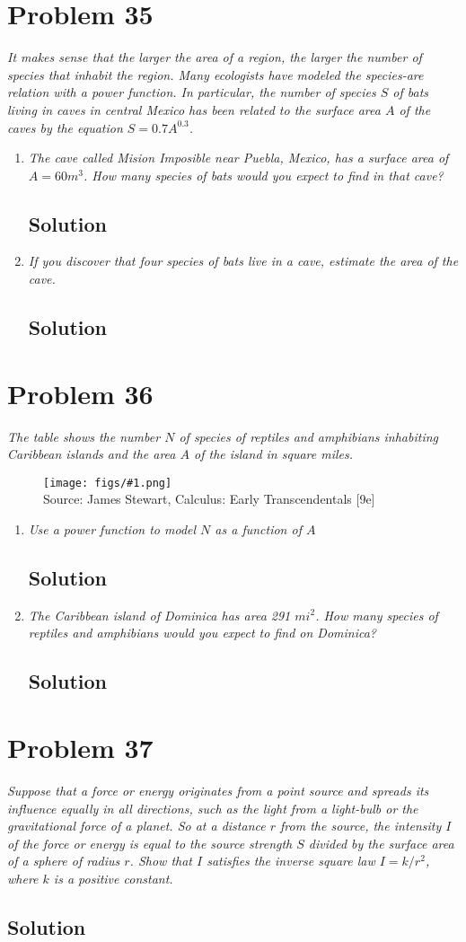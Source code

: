 \documentclass[11pt]{article}
\newcommand{\soln}{\subsection*}
\newcommand{\qn}{\textit}
\newcommand{\imagesource}[1]{{\footnotesize Source: #1}}
\newcommand{\imgqn}[1]{
	\begin{figure}[H]
		\centering
		\texttt{[image: figs/\#1.png]}\\
		\imagesource{James Stewart, Calculus: Early Transcendentals [9e]}
	\end{figure}
}
\begin{document}
\section*{Problem 35}

\qn{It makes sense that the larger the area of a region, the larger the number of species that inhabit the region. Many ecologists have modeled the species-are relation with a power function. In particular, the number of species $S$ of bats living in caves in central Mexico has been related to the surface area $A$ of the caves by the equation $S=0.7A^{0.3}$.}

\begin{enumerate}
	\item \qn{The cave called Mision Imposible near Puebla, Mexico, has a surface area of $A=60m^3$. How many species of bats would you expect to find in that cave?}
	\soln{Solution}
	
	\item \qn{If you discover that four species of bats live in a cave, estimate the area of the cave.}
	\soln{Solution}
\end{enumerate}

\section*{Problem 36}

\qn{The table shows the number $N$ of species of reptiles and amphibians inhabiting Caribbean islands and the area $A$ of the island in square miles.}

\imgqn{1.2.36}

\begin{enumerate}
	\item \qn{Use a power function to model $N$ as a function of $A$}
	\soln{Solution}
	
	\item \qn{The Caribbean island of Dominica has area 291 $mi^2$. How many species of reptiles and amphibians would you expect to find on Dominica?}
	\soln{Solution}
\end{enumerate}

\section*{Problem 37}

\qn{Suppose that a force or energy originates from a point source and spreads its influence equally in all directions, such as the light from a light-bulb or the gravitational force of a planet. So at a distance $r$ from the source, the intensity $I$ of the force or energy is equal to the source strength $S$ divided by the surface area of a sphere of radius $r$. Show that $I$ satisfies the inverse square law $I=k/r^2$, where $k$ is a positive constant.}

\soln{Solution}
\end{document}
